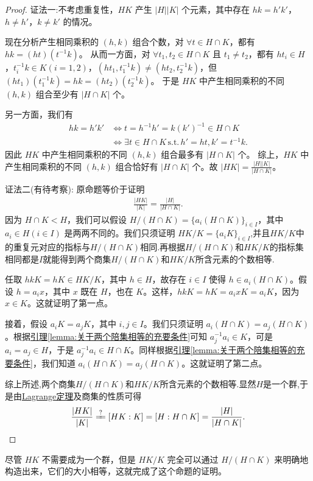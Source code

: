 \documentclass[../../main.tex]{subfiles}
\begin{document}
\begin{proof}
{\color{blue}证法一:}不考虑重复性，\(HK\) 产生 \(|H||K|\) 个元素，其中存在 \(hk = h'k'\)，\(h \ne h'\)，\(k \ne k'\) 的情况。

现在分析产生相同乘积的 \((h, k)\) 组合个数，对 \(\forall t \in H \cap K\)，都有 \(hk = (ht)(t^{-1}k)\)。
从而一方面，对 \(\forall t_1, t_2 \in H \cap K\) 且 \(t_1 \ne t_2\)，都有 \(ht_i \in H\)，\(t_{i}^{-1}k \in K (i = 1, 2)\)，\((ht_1, t_{1}^{-1}k) \ne (ht_2, t_{2}^{-1}k)\)，但 \((ht_1)(t_{1}^{-1}k) = hk = (ht_2)(t_{2}^{-1}k)\)。
于是 \(HK\) 中产生相同乘积的不同 \((h, k)\) 组合至少有 \(|H \cap K|\) 个。

另一方面，我们有
\begin{align*}
hk = h'k' &\iff t = h^{-1}h' = k(k')^{-1} \in H \cap K \\
&\iff \exists t \in H \cap K \, \mathrm{s.t.} \, h' = ht, k' = t^{-1}k.
\end{align*}
因此 \(HK\) 中产生相同乘积的不同 \((h, k)\) 组合最多有 \(|H \cap K|\) 个。
综上，\(HK\) 中产生相同乘积的不同 \((h, k)\) 组合恰好有 \(|H \cap K|\) 个。故 \(|HK| = \frac{|H||K|}{|H \cap K|}\)。 


{\color{blue}证法二(有待考察):}
原命题等价于证明
\begin{align*}
\frac{|HK|}{|K|} = \frac{|H|}{|H \cap K|} .
\end{align*}
因为 \(H \cap K < H\)，我们可以假设 \(H/(H \cap K) = \{a_i(H \cap K)\}_{i \in I}\)，其中 \(a_i \in H (i \in I)\) 是两两不同的。我们只须证明 \(HK/K = \{a_iK\}_{i \in I}\),并且$HK/K$中的重复元对应的指标与$H/(H \cap K)$相同.再根据$H/(H \cap K)$和$HK/K$的指标集相同都是$I$就能得到两个商集$H/(H \cap K)$和$HK/K$所含元素的个数相等.

任取 \(hkK = hK \in HK/K\)，其中 \(h \in H\)，故存在 \(i \in I\) 使得 \(h \in a_i(H \cap K)\)。假设 \(h = a_ix\)，其中 \(x\) 既在 \(H\)，也在 \(K\)。这样，\(hkK = hK = a_ixK = a_iK\)，因为 \(x \in K\)。这就证明了第一点。

接着，假设 \(a_iK = a_jK\)，其中 \(i, j \in I\)。我们只须证明 \(a_i(H \cap K) = a_j(H \cap K)\)。根据\hyperref[lemma:关于两个陪集相等的充要条件]{引理\ref{lemma:关于两个陪集相等的充要条件}}可知 \(a_j^{-1}a_i \in K\)，可是 \(a_i = a_j \in H\)，于是 \(a_j^{-1}a_i \in H \cap K\)。同样根据\hyperref[lemma:关于两个陪集相等的充要条件]{引理\ref{lemma:关于两个陪集相等的充要条件}}，我们知道 \(a_i(H \cap K) = a_j(H \cap K)\)。这就证明了第二点。

综上所述,两个商集$H/(H \cap K)$和$HK/K$所含元素的个数相等.显然$H$是一个群,于是由\hyperref[theorem:Lagrange定理]{Lagrange定理}及商集的性质可得
\begin{align*}
\frac{|HK|}{|K|}\xlongequal{?}\left[ HK:K \right] =\left[ H:H\cap K \right] =\frac{|H|}{|H\cap K|}.
\end{align*}
\end{proof}
\begin{remark}
尽管 \(HK\) 不需要成为一个群，但是 \(HK/K\) 完全可以通过 \(H/(H \cap K)\) 来明确地构造出来，它们的大小相等，这就完成了这个命题的证明。 
\end{remark}
\end{document}
